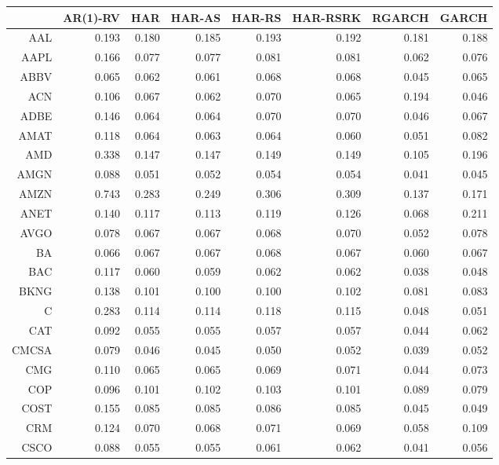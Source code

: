 \begin{table}[ht]
\centering
\begin{tabular}{rrrrrrrr}
  \hline
 & AR(1)-RV & HAR & HAR-AS & HAR-RS & HAR-RSRK & RGARCH & GARCH \\ 
  \hline
AAL & 0.193 & 0.180 & 0.185 & 0.193 & 0.192 & 0.181 & 0.188 \\ 
  AAPL & 0.166 & 0.077 & 0.077 & 0.081 & 0.081 & 0.062 & 0.076 \\ 
  ABBV & 0.065 & 0.062 & 0.061 & 0.068 & 0.068 & 0.045 & 0.065 \\ 
  ACN & 0.106 & 0.067 & 0.062 & 0.070 & 0.065 & 0.194 & 0.046 \\ 
  ADBE & 0.146 & 0.064 & 0.064 & 0.070 & 0.070 & 0.046 & 0.067 \\ 
  AMAT & 0.118 & 0.064 & 0.063 & 0.064 & 0.060 & 0.051 & 0.082 \\ 
  AMD & 0.338 & 0.147 & 0.147 & 0.149 & 0.149 & 0.105 & 0.196 \\ 
  AMGN & 0.088 & 0.051 & 0.052 & 0.054 & 0.054 & 0.041 & 0.045 \\ 
  AMZN & 0.743 & 0.283 & 0.249 & 0.306 & 0.309 & 0.137 & 0.171 \\ 
  ANET & 0.140 & 0.117 & 0.113 & 0.119 & 0.126 & 0.068 & 0.211 \\ 
  AVGO & 0.078 & 0.067 & 0.067 & 0.068 & 0.070 & 0.052 & 0.078 \\ 
  BA & 0.066 & 0.067 & 0.067 & 0.068 & 0.067 & 0.060 & 0.067 \\ 
  BAC & 0.117 & 0.060 & 0.059 & 0.062 & 0.062 & 0.038 & 0.048 \\ 
  BKNG & 0.138 & 0.101 & 0.100 & 0.100 & 0.102 & 0.081 & 0.083 \\ 
  C & 0.283 & 0.114 & 0.114 & 0.118 & 0.115 & 0.048 & 0.051 \\ 
  CAT & 0.092 & 0.055 & 0.055 & 0.057 & 0.057 & 0.044 & 0.062 \\ 
  CMCSA & 0.079 & 0.046 & 0.045 & 0.050 & 0.052 & 0.039 & 0.052 \\ 
  CMG & 0.110 & 0.065 & 0.065 & 0.069 & 0.071 & 0.044 & 0.073 \\ 
  COP & 0.096 & 0.101 & 0.102 & 0.103 & 0.101 & 0.089 & 0.079 \\ 
  COST & 0.155 & 0.085 & 0.085 & 0.086 & 0.085 & 0.045 & 0.049 \\ 
  CRM & 0.124 & 0.070 & 0.068 & 0.071 & 0.069 & 0.058 & 0.109 \\ 
  CSCO & 0.088 & 0.055 & 0.055 & 0.061 & 0.062 & 0.041 & 0.056 \\ 

\end{tabular}
\end{table}
